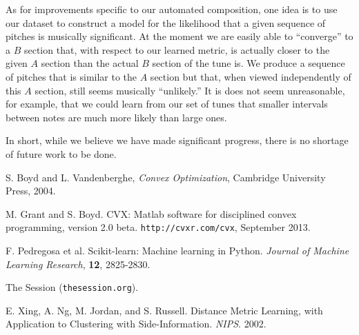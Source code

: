 \documentclass{article} %
\begin{document}
As for improvements specific to our automated composition, one idea is to
use our dataset to construct a model for the likelihood that a given sequence
of pitches is musically significant. At the moment we are easily able to
``converge'' to a $B$ section that, with respect to our learned metric, is
actually closer to the given $A$ section than the actual $B$ section of the
tune is. We produce a sequence of pitches that is similar to the $A$ section
but that, when viewed independently of this $A$ section, still seems musically
``unlikely.'' It is does not seem unreasonable, for example, that we could
learn from our set of tunes that smaller intervals between notes are much more
likely than large ones.

In short, while we believe we have made significant progress, there is no
shortage of future work to be done.

\begin{thebibliography}{9}

S. Boyd and L. Vandenberghe, \textit{Convex Optimization}, Cambridge University
Press, 2004.

M. Grant and S. Boyd. CVX: Matlab software for disciplined convex
programming, version 2.0 beta. \texttt{http://cvxr.com/cvx}, September 2013.

F. Pedregosa et al. Scikit-learn: Machine learning in Python. 
\textit{Journal of Machine Learning Research}, \textbf{12}, 2825-2830.

The Session (\texttt{thesession.org}).

E. Xing, A. Ng, M. Jordan, and S. Russell. Distance Metric Learning, with
Application to Clustering with Side-Information. \textit{NIPS}. 2002.

\end{thebibliography}
\end{document}
